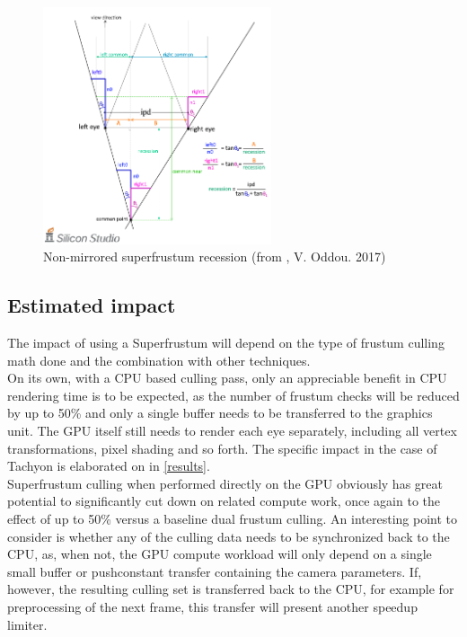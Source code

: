 \begin{figure}[htb]
  \centering
  \includegraphics[width=0.6\textwidth]{pictures/Oddou_Asymmetry}
  \caption{Non-mirrored superfrustum recession (from \cite{Oddou.23.05.2017}, V. Oddou. 2017)} \label{fig:Oddou_Asymmetry}
\end{figure}

\subsection{Estimated impact}
The impact of using a Superfrustum will depend on the type of frustum culling math done and the combination with other techniques. \\
On its own, with a CPU based culling pass, only an appreciable benefit in CPU rendering time is to be expected, as the number of frustum checks will be reduced by up to 50\% and only a single buffer needs to be transferred to the graphics unit. The GPU itself still needs to render each eye separately, including all vertex transformations, pixel shading and so forth. The specific impact in the case of \gls{Tachyon} is elaborated on in \autoref{results}. \\
Superfrustum culling when performed directly on the GPU obviously has great potential to significantly cut down on related compute work, once again to the effect of up to 50\% versus a baseline dual frustum culling. An interesting point to consider is whether any of the culling data needs to be synchronized back to the CPU, as, when not, the GPU compute workload will only depend on a single small buffer or pushconstant transfer containing the camera parameters. If, however, the resulting culling set is transferred back to the CPU, for example for preprocessing of the next frame, this transfer will present another speedup limiter. 

